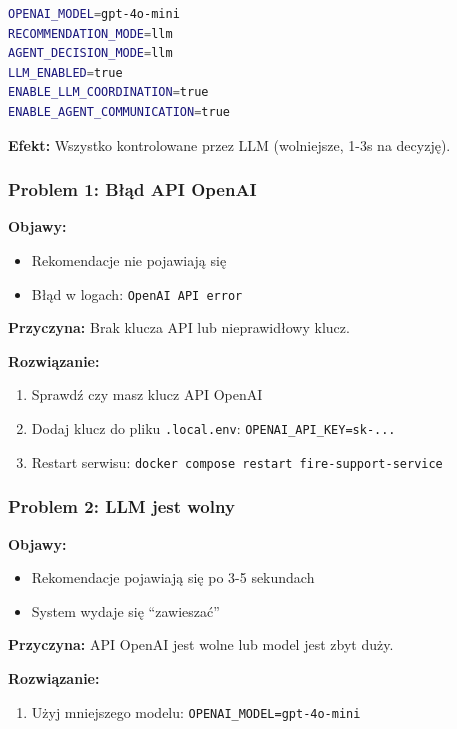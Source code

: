 \documentclass[11pt,a4paper]{article}
\begin{document}
\begin{lstlisting}[language=bash, basicstyle=\small]
OPENAI_MODEL=gpt-4o-mini
RECOMMENDATION_MODE=llm
AGENT_DECISION_MODE=llm
LLM_ENABLED=true
ENABLE_LLM_COORDINATION=true
ENABLE_AGENT_COMMUNICATION=true
\end{lstlisting}

\textbf{Efekt:} Wszystko kontrolowane przez LLM (wolniejsze, 1-3s na decyzję).

\subsubsection{Problem 1: Błąd API OpenAI}

\textbf{Objawy:}
\begin{itemize}
    \item Rekomendacje nie pojawiają się
    \item Błąd w logach: \texttt{OpenAI API error}
\end{itemize}

\textbf{Przyczyna:} Brak klucza API lub nieprawidłowy klucz.

\textbf{Rozwiązanie:}
\begin{enumerate}
    \item Sprawdź czy masz klucz API OpenAI
    \item Dodaj klucz do pliku \texttt{.local.env}: \texttt{OPENAI\_API\_KEY=sk-...}
    \item Restart serwisu: \texttt{docker compose restart fire-support-service}
\end{enumerate}

\subsubsection{Problem 2: LLM jest wolny}

\textbf{Objawy:}
\begin{itemize}
    \item Rekomendacje pojawiają się po 3-5 sekundach
    \item System wydaje się ``zawieszać''
\end{itemize}

\textbf{Przyczyna:} API OpenAI jest wolne lub model jest zbyt duży.

\textbf{Rozwiązanie:}
\begin{enumerate}
    \item Użyj mniejszego modelu: \texttt{OPENAI\_MODEL=gpt-4o-mini}
\end{enumerate}
\end{document}
